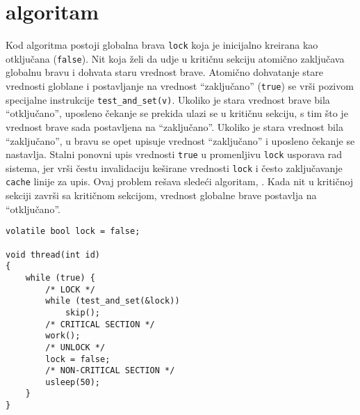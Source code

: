\clearpage
\section{ algoritam}
Kod \textbf{} algoritma postoji globalna brava \texttt{lock} koja je inicijalno kreirana kao otklju\v{c}ana (\texttt{false}). Nit koja \v{z}eli da udje u kriti\v{c}nu sekciju atomi\v{c}no zaklju\v{c}ava globalnu bravu i dohvata staru vrednost brave. Atomi\v{c}no dohvatanje stare vrednosti globlane i postavljanje na vrednost ``zaklju\v{c}ano'' (\texttt{true}) se vr\v{s}i pozivom specijalne instrukcije \texttt{test\_and\_set(v)}. Ukoliko je stara vrednost brave bila ``otklju\v{c}ano'', uposleno \v{c}ekanje se prekida ulazi se u kriti\v{c}nu sekciju, s tim \v{s}to je vrednost brave sada postavljena na ``zaklju\v{c}ano''. Ukoliko je stara vrednost bila ``zaklju\v{c}ano'', u bravu se opet upisuje vrednost ``zaklju\v{c}ano'' i uposleno \v{c}ekanje se nastavlja. Stalni ponovni upis vrednosti \texttt{true} u promenljivu \texttt{lock} usporava rad sistema, jer vr\v{s}i \v{c}estu invalidaciju ke\v{s}irane vrednosti \texttt{lock} i \v{c}esto zaklju\v{c}avanje \texttt{cache} linije za upis. Ovaj problem re\v{s}ava slede\'{c}i algoritam, \textbf{}. Kada nit u kriti\v{c}noj sekciji zavr\v{s}i sa kriti\v{c}nom sekcijom, vrednost globalne brave postavlja na ``otklju\v{c}ano''.
\begin{lstlisting}
volatile bool lock = false;

void thread(int id)
{
    while (true) {
		/* LOCK */
        while (test_and_set(&lock))
            skip();
		/* CRITICAL SECTION */
		work();
		/* UNLOCK */
		lock = false;
		/* NON-CRITICAL SECTION */
        usleep(50);
    }
}
\end{lstlisting}